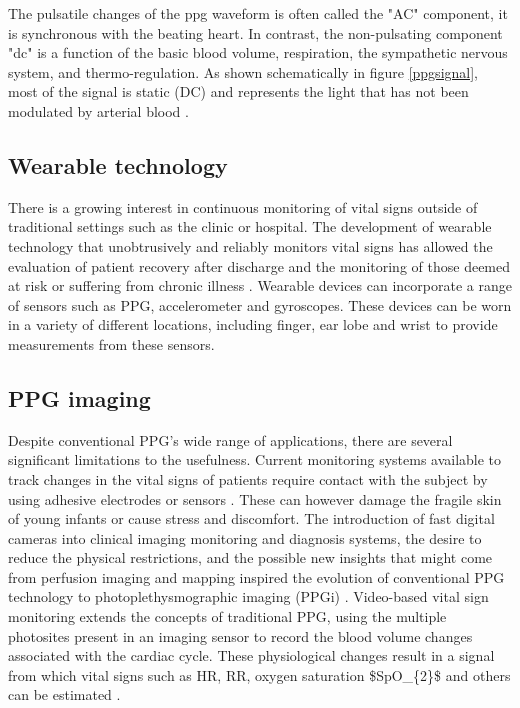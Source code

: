 The pulsatile changes of the \gls{ppg} waveform is often called the "AC" component, it is synchronous with the beating heart. In contrast, the non-pulsating component "\gls{dc}" is a function of the basic blood volume,  respiration,  the  sympathetic nervous system, and thermo-regulation. As shown  schematically  in figure \ref{ppgsignal},  most of the signal is static (DC) and represents the light that has not been modulated by arterial blood \cite{mendelson1992pulse}. 

\subsection{Wearable technology}

There is a growing interest in continuous monitoring of vital signs outside of traditional settings such as the clinic or hospital. The development of wearable technology that unobtrusively and reliably monitors vital signs has allowed the evaluation of patient recovery after discharge and the monitoring of those deemed at risk or suffering from chronic illness \cite{bonato2005advances}. Wearable devices can incorporate a range of sensors such as PPG, accelerometer and gyroscopes. These devices can be worn in a variety of different locations, including finger, ear lobe and wrist to provide measurements from these sensors.

\subsection{PPG imaging}

Despite conventional PPG’s wide range of applications, there are several significant limitations to the usefulness. Current monitoring systems available to track changes in the vital signs of patients require contact with the subject by using adhesive electrodes or sensors \cite{villarroel2017non}. These can however damage the fragile skin of young infants or cause stress and discomfort. The introduction of fast digital cameras into clinical imaging monitoring and diagnosis systems, the desire to reduce the physical restrictions, and the possible new insights that might come from perfusion imaging and mapping inspired the evolution of conventional PPG technology to photoplethysmographic imaging (PPGi) \cite{sun2015photoplethysmography}. Video-based vital sign monitoring extends the concepts of traditional PPG, using the multiple photosites present in an imaging sensor to record the blood volume changes associated with the cardiac cycle. These physiological changes result in a signal from which vital signs such as HR, RR, oxygen saturation \gls{$SpO_{2}$} and others can be estimated \cite{tarassenko2014non, villarroel2014continuous}.

